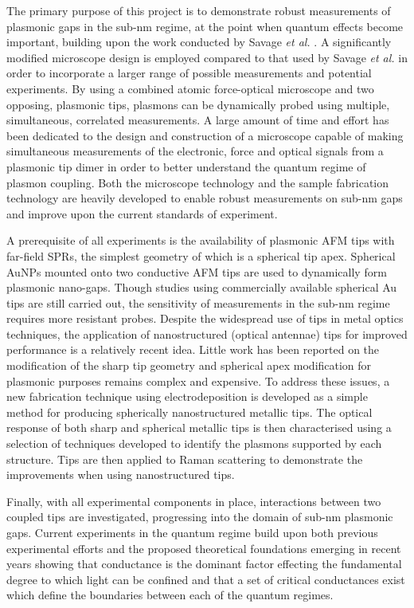 \documentclass[12pt, a4paper, twoside]{book}
\begin{document}
The primary purpose of this project is to demonstrate robust measurements of plasmonic gaps in the sub-nm regime, at the point when quantum effects become important, building upon the work conducted by Savage \textit{et al.} \cite{savage2012}. A significantly modified microscope design is employed compared to that used by Savage \textit{et al.} in order to incorporate a larger range of possible measurements and potential experiments. By using a combined atomic force-optical microscope and two opposing, plasmonic tips, plasmons can be dynamically probed using multiple, simultaneous, correlated measurements. A large amount of time and effort has been dedicated to the design and construction of a microscope capable of making simultaneous measurements of the electronic, force and optical signals from a plasmonic tip dimer in order to better understand the quantum regime of plasmon coupling. Both the microscope technology and the sample fabrication technology are heavily developed to enable robust measurements on sub-nm gaps and improve upon the current standards of experiment.

A prerequisite of all experiments is the availability of plasmonic AFM tips with far-field SPRs, the simplest geometry of which is a spherical tip apex. Spherical AuNPs mounted onto two conductive AFM tips are used to dynamically form plasmonic nano-gaps. Though studies using commercially available spherical Au tips are still carried out, the sensitivity of measurements in the sub-nm regime requires more resistant probes. Despite the widespread use of tips in metal optics techniques, the application of nanostructured (optical antennae) tips for improved performance is a relatively recent idea. Little work has been reported on the modification of the sharp tip geometry and spherical apex modification for plasmonic purposes remains complex and expensive. To address these issues, a new fabrication technique using electrodeposition is developed as a simple method for producing spherically nanostructured metallic tips. The optical response of both sharp and spherical metallic tips is then characterised using a selection of techniques developed to identify the plasmons supported by each structure. Tips are then applied to Raman scattering to demonstrate the improvements when using nanostructured tips.

Finally, with all experimental components in place, interactions between two coupled tips are investigated, progressing into the domain of sub-nm plasmonic gaps. Current experiments in the quantum regime build upon both previous experimental efforts and the proposed theoretical foundations emerging in recent years showing that conductance is the dominant factor effecting the fundamental degree to which light can be confined and that a set of critical conductances exist which define the boundaries between each of the quantum regimes.
\end{document}

